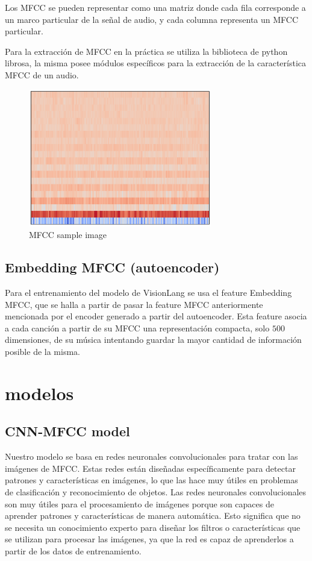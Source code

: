 \documentclass[colorinlistoftodos,twoside,twocolumn,10pt]{article} %
\begin{document}
Los MFCC se pueden representar como una matriz donde cada fila corresponde a un marco particular de la se\~nal de audio, y cada columna representa un MFCC particular.

Para la extracci\'on de MFCC en la pr\'actica se utiliza la biblioteca de python librosa, la misma posee m\'odulos espec\'ificos para la extracci\'on de la caracter\'istica MFCC de un audio.

\begin{figure}[h!] 
	\centering
	\includegraphics[width=8cm]{mfcc.png}
	\caption{MFCC sample image}
\end{figure}

\subsection {Embedding MFCC (autoencoder)}
Para el entrenamiento del modelo de VisionLang se usa el feature Embedding MFCC, que se halla a partir de pasar la feature MFCC anteriormente mencionada por el encoder generado a partir del autoencoder. Esta feature asocia a cada canci\'on a partir de su MFCC una representaci\'on compacta, solo $500$ dimensiones, de su m\'usica intentando guardar la mayor cantidad de informaci\'on posible de la misma. 

\section{modelos} %
\subsection {CNN-MFCC model}
Nuestro modelo se basa en redes neuronales convolucionales para tratar con las im\'agenes de MFCC. Estas redes est\'an dise\~nadas espec\'ificamente para detectar patrones y caracter\'isticas en im\'agenes, lo que las hace muy \'utiles en problemas de clasificaci\'on y reconocimiento de objetos. Las redes neuronales convolucionales son muy \'utiles para el procesamiento de im\'agenes porque son capaces de aprender patrones y caracter\'isticas de manera autom\'atica. Esto significa que no se necesita un conocimiento experto para dise\~nar los filtros o caracter\'isticas que se utilizan para procesar las im\'agenes, ya que la red es capaz de aprenderlos a partir de los datos de entrenamiento.
\end{document}
